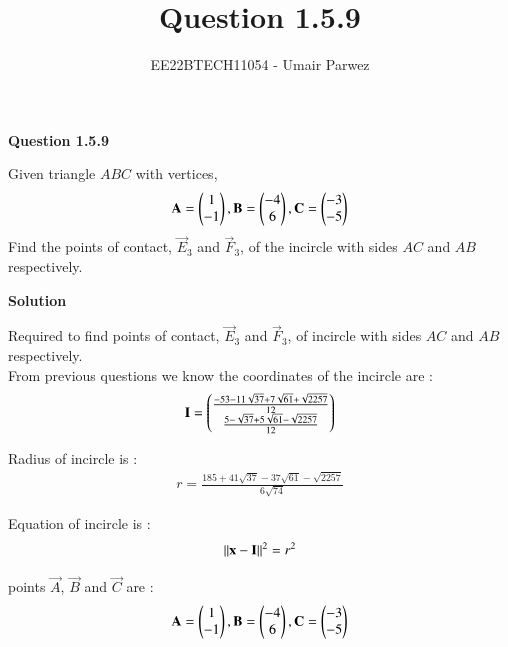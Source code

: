 \documentclass[journal,12pt,twocolumn]{IEEEtran}
\theoremstyle{remark}
\begin{document}



\vspace{3cm}

\title{
	Question 1.5.9
}

\author{
	EE22BTECH11054 - Umair Parwez
}	

\maketitle
\newpage


\renewcommand{\thefigure}{\theenumi}
\renewcommand{\thetable}{\theenumi}


\textbf{Question 1.5.9}
	
Given triangle $ABC$ with vertices, 
\begin{align}
	\mathbf{A} = \begin{pmatrix}1\\ -1\end{pmatrix}, \mathbf{B} = \begin{pmatrix}-4\\ 6\end{pmatrix}, \mathbf{C} = \begin{pmatrix}-3\\ -5\end{pmatrix}
\end{align}
Find the points of contact, $\vec{E}_3$ and $\vec{F}_3$, of the incircle with sides $AC$ and $AB$ respectively.
	

\textbf{Solution}
	

Required to find points of contact, $\vec{E}_3$ and $\vec{F}_3$, of incircle with sides $AC$ and $AB$ respectively.\\

	

From previous questions we know the coordinates of the incircle are : 
\begin{align}
	\mathbf{I} = 
	\begin{pmatrix}
		\frac{-53-11\sqrt{37}+7\sqrt{61}+\sqrt{2257}}{12} \\ 
		\frac{5-\sqrt{37}+5\sqrt{61}-\sqrt{2257}}{12}
	\end{pmatrix}
\end{align}

Radius of incircle is :
    \begin{align}
		r = \frac{185+41\sqrt{37}-37\sqrt{61}-\sqrt{2257}}{6\sqrt{74}}
	\end{align}

Equation of incircle is : 
\begin{align}
	{\left\lVert \mathbf{x}-\mathbf{I} \right\rVert}^2 = {r}^2 \label{eq:circle}
\end{align}

points $\vec{A}$, $\vec{B}$ and $\vec{C}$ are : 
\begin{align}
	\mathbf{A} = \begin{pmatrix}
		1\\
		-1
	\end{pmatrix}, 
	\mathbf{B} = \begin{pmatrix}
		-4\\
		6
	\end{pmatrix}, 
	\mathbf{C} = \begin{pmatrix}
		-3\\
		-5
	\end{pmatrix}
\end{align}
\end{document}
